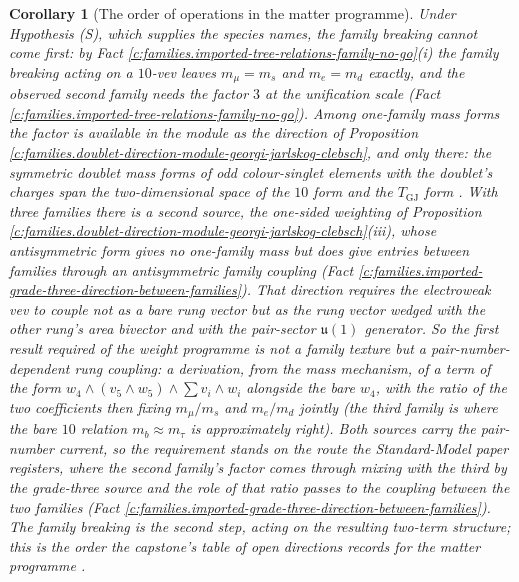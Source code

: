 \documentclass[11pt]{article}
\newtheorem{corollary}[theorem]{Corollary}
\theoremstyle{definition}
\theoremstyle{plain}
\newcommand{\changedmark}[2]{\marginpar{\raggedright\scriptsize\color{#1}#2}}
\providecommand{\uu}{}\renewcommand{\uu}{\mathfrak{u}}
\begin{document}
\begin{corollary}[The order of operations in the matter programme]\label{c:families.order-operations-matter-programme}
\changedmark{gray}{reworded}
Under Hypothesis (S), which supplies the species names, the family breaking cannot come first: by Fact \ref{c:families.imported-tree-relations-family-no-go}(i) the family breaking acting on a $10$-vev leaves $m_{\mu} = m_{s}$ and $m_{e} = m_{d}$ exactly, and the observed second family needs the factor $3$ at the unification scale (Fact \ref{c:families.imported-tree-relations-family-no-go}). Among one-family mass forms the factor is available in the module as the direction of Proposition \ref{c:families.doublet-direction-module-georgi-jarlskog-clebsch}, and only there: the symmetric doublet mass forms of odd colour-singlet elements with the doublet's charges span the two-dimensional space of the $10$ form and the $T_{\mathrm{GJ}}$ form \cite[Prop.~9.32]{ButlerT12}. With three families there is a second source, the one-sided weighting of Proposition \ref{c:families.doublet-direction-module-georgi-jarlskog-clebsch}(iii), whose antisymmetric form gives no one-family mass but does give entries between families through an antisymmetric family coupling (Fact \ref{c:families.imported-grade-three-direction-between-families}). That direction requires the electroweak vev to couple not as a bare rung vector but as the rung vector wedged with the other rung's area bivector and with the pair-sector $\uu(1)$ generator. So the first result required of the weight programme is not a family texture but a \emph{pair-number-dependent rung coupling}: a derivation, from the mass mechanism, of a term of the form $w_{4}\wedge(v_{5}\wedge w_{5})\wedge\sum v_{i}\wedge w_{i}$ alongside the bare $w_{4}$, with the ratio of the two coefficients then fixing $m_{\mu}/m_{s}$ and $m_{e}/m_{d}$ jointly (the third family is where the bare $10$ relation $m_{b} \approx m_{\tau}$ is approximately right). Both sources carry the pair-number current, so the requirement stands on the route the Standard-Model paper registers, where the second family's factor comes through mixing with the third by the grade-three source and the role of that ratio passes to the coupling between the two families (Fact \ref{c:families.imported-grade-three-direction-between-families}). The family breaking is the second step, acting on the resulting two-term structure; this is the order the capstone's table of open directions records for the matter programme \cite[Table~4]{ButlerT17}.
\end{corollary}
\end{document}
